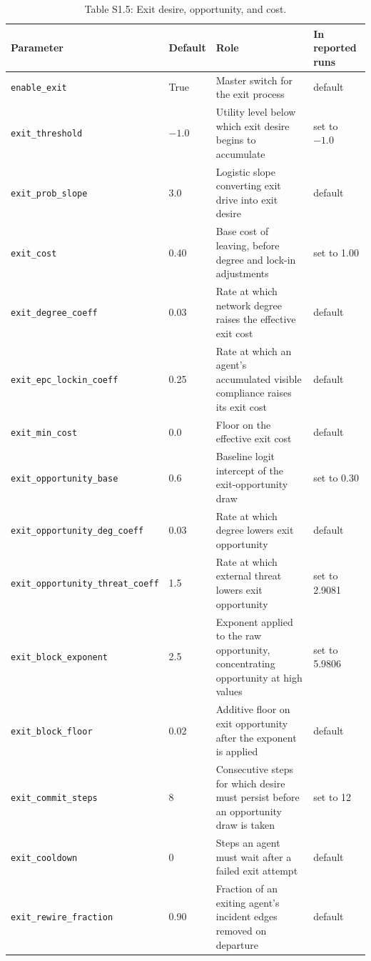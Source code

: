 \documentclass[12pt]{article}
\begin{document}
\begin{table}[htbp]
\centering
\footnotesize
\caption{Table S1.5: Exit desire, opportunity, and cost.}
\begin{tabular}{p{4.9cm}p{1.3cm}p{4.5cm}p{2.4cm}}
\toprule
Parameter & Default & Role & In reported runs \\
\midrule
\texttt{enable\_exit} & True & Master switch for the exit process & default \\
\texttt{exit\_threshold} & $-1.0$ & Utility level below which exit desire begins to accumulate & set to $-1.0$ \\
\texttt{exit\_prob\_slope} & 3.0 & Logistic slope converting exit drive into exit desire & default \\
\texttt{exit\_cost} & 0.40 & Base cost of leaving, before degree and lock-in adjustments & set to 1.00 \\
\texttt{exit\_degree\_coeff} & 0.03 & Rate at which network degree raises the effective exit cost & default \\
\texttt{exit\_epc\_lockin\_coeff} & 0.25 & Rate at which an agent's accumulated visible compliance raises its exit cost & default \\
\texttt{exit\_min\_cost} & 0.0 & Floor on the effective exit cost & default \\
\texttt{exit\_opportunity\_base} & 0.6 & Baseline logit intercept of the exit-opportunity draw & set to 0.30 \\
\texttt{exit\_opportunity\_deg\_coeff} & 0.03 & Rate at which degree lowers exit opportunity & default \\
\texttt{exit\_opportunity\_threat\_coeff} & 1.5 & Rate at which external threat lowers exit opportunity & set to 2.9081 \\
\texttt{exit\_block\_exponent} & 2.5 & Exponent applied to the raw opportunity, concentrating opportunity at high values & set to 5.9806 \\
\texttt{exit\_block\_floor} & 0.02 & Additive floor on exit opportunity after the exponent is applied & default \\
\texttt{exit\_commit\_steps} & 8 & Consecutive steps for which desire must persist before an opportunity draw is taken & set to 12 \\
\texttt{exit\_cooldown} & 0 & Steps an agent must wait after a failed exit attempt & default \\
\texttt{exit\_rewire\_fraction} & 0.90 & Fraction of an exiting agent's incident edges removed on departure & default \\

\end{tabular}
\end{table}
\end{document}
